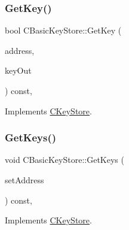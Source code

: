 \mbox{\label{class_c_basic_key_store_a69328ee642e4234922356f59876e956d}} 
\subsubsection{\texorpdfstring{Get\+Key()}{GetKey()}}
{\footnotesize\ttfamily bool C\+Basic\+Key\+Store\+::\+Get\+Key (\begin{DoxyParamCaption}\item[{const \mbox{\hyperlink{class_c_key_i_d}{C\+Key\+ID}} \&}]{address,  }\item[{\mbox{\hyperlink{class_c_key}{C\+Key}} \&}]{key\+Out }\end{DoxyParamCaption}) const\hspace{0.3cm}{\ttfamily [inline]}, {\ttfamily [virtual]}}



Implements \mbox{\hyperlink{class_c_key_store_a2dffca468fef2e5da2e42a7c983d968a}{C\+Key\+Store}}.

\mbox{\label{class_c_basic_key_store_a41f3895021dae008582ceb55a98b0891}} 
\subsubsection{\texorpdfstring{Get\+Keys()}{GetKeys()}}
{\footnotesize\ttfamily void C\+Basic\+Key\+Store\+::\+Get\+Keys (\begin{DoxyParamCaption}\item[{std\+::set$<$ \mbox{\hyperlink{class_c_key_i_d}{C\+Key\+ID}} $>$ \&}]{set\+Address }\end{DoxyParamCaption}) const\hspace{0.3cm}{\ttfamily [inline]}, {\ttfamily [virtual]}}



Implements \mbox{\hyperlink{class_c_key_store_aca5044014720308f191113e7ba297d13}{C\+Key\+Store}}.

\mbox{\label{class_c_basic_key_store_a588967be388dfc70f0449b576eea420a}} 
